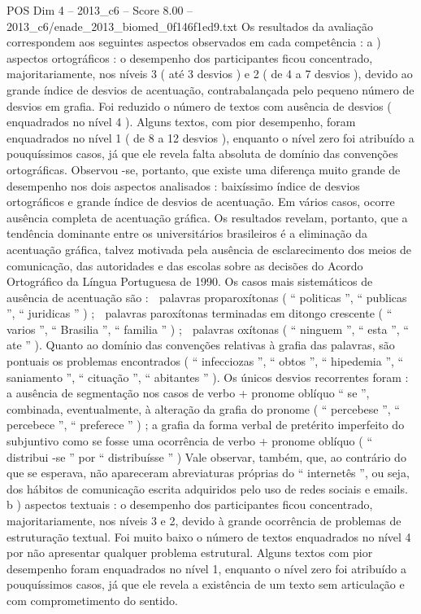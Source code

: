 \begin{textsample}{POS Dim 4 – 2013\_c6 – Score 8.00 – 2013\_c6/enade\_2013\_biomed\_0f146f1ed9.txt}
Os resultados da avaliação correspondem aos seguintes aspectos observados em cada competência : a ) aspectos ortográficos : o desempenho dos participantes ficou concentrado, majoritariamente, nos níveis 3 ( até 3 desvios ) e 2 ( de 4 a 7 desvios ), devido ao grande índice de desvios de acentuação, contrabalançada pelo pequeno número de desvios em grafia.
Foi reduzido o número de textos com ausência de desvios ( enquadrados no nível 4 ).
Alguns textos, com pior desempenho, foram enquadrados no nível 1 ( de 8 a 12 desvios ), enquanto o nível zero foi atribuído a pouquíssimos casos, já que ele revela falta absoluta de domínio das convenções ortográficas.
Observou -se, portanto, que existe uma diferença muito grande de desempenho nos dois aspectos analisados : baixíssimo índice de desvios ortográficos e grande índice de desvios de acentuação.
Em vários casos, ocorre ausência completa de acentuação gráfica.
Os resultados revelam, portanto, que a tendência dominante entre os universitários brasileiros é a eliminação da acentuação gráfica, talvez motivada pela ausência de esclarecimento dos meios de comunicação, das autoridades e das escolas sobre as decisões do Acordo Ortográfico da Língua Portuguesa de 1990.
Os casos mais sistemáticos de ausência de acentuação são :  palavras proparoxítonas ( “ politicas ”, “ publicas ”, “ juridicas ” ) ;  palavras paroxítonas terminadas em ditongo crescente ( “ varios ”, “ Brasilia ”, “ familia ” ) ;  palavras oxítonas ( “ ninguem ”, “ esta ”, “ ate ” ).
Quanto ao domínio das convenções relativas à grafia das palavras, são pontuais os problemas encontrados ( “ infecciozas ”, “ obtos ”, “ hipedemia ”, “ saniamento ”, “ cituação ”, “ abitantes ” ).
Os únicos desvios recorrentes foram : a ausência de segmentação nos casos de verbo + pronome oblíquo “ se ”, combinada, eventualmente, à alteração da grafia do pronome ( “ percebese ”, “ percebece ”, “ preferece ” ) ; a grafia da forma verbal de pretérito imperfeito do subjuntivo como se fosse uma ocorrência de verbo + pronome oblíquo ( “ distribui -se ” por “ distribuísse ” ) Vale observar, também, que, ao contrário do que se esperava, não apareceram abreviaturas próprias do “ internetês ”, ou seja, dos hábitos de comunicação escrita adquiridos pelo uso de redes sociais e emails. b ) aspectos textuais : o desempenho dos participantes ficou concentrado, majoritariamente, nos níveis 3 e 2, devido à grande ocorrência de problemas de estruturação textual.
Foi muito baixo o número de textos enquadrados no nível 4 por não apresentar qualquer problema estrutural.
Alguns textos com pior desempenho foram enquadrados no nível 1, enquanto o nível zero foi atribuído a pouquíssimos casos, já que ele revela a existência de um texto sem articulação e com comprometimento do sentido.

\end{textsample}

